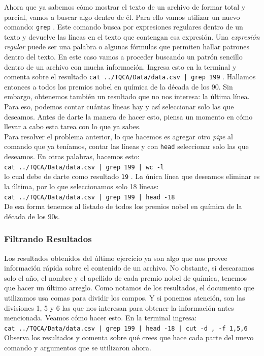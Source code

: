 \documentclass[10pt,letterpaper]{article}
\newcommand{\inlinecode}[1]{
\colorbox{light-gray}{\texttt{#1}}
}
\begin{document}
Ahora que ya sabemos c\'omo mostrar el texto de un archivo de formar total y parcial, vamos a buscar algo dentro de \'el. Para ello vamos utilizar un nuevo comando: \inlinecode{grep}. Este comando busca por expresiones regulares dentro de un texto y devuelve las l\'ineas en el texto que contengan esa expresi\'on. Una \emph{expresi\'on regular} puede ser una palabra o algunas f\'ormulas que permiten hallar patrones dentro del texto. En este caso vamos a proceder buscando un patr\'on sencillo dentro de un archivo con mucha informaci\'on. Ingresa esto en la terminal y comenta sobre el resultado \inlinecode{cat ../TQCA/Data/data.csv | grep 199}. Hallamos entonces a todos los premios nobel en qu\'imica de la d\'ecada de los 90. Sin embargo, obtenemos tambi\'en un resultado que no nos interesa: la \'ultima l\'inea. Para eso, podemos contar cu\'antas l\'ineas hay y as\'i seleccionar solo las que deseamos. Antes de darte la manera de hacer esto, piensa un momento en c\'omo llevar a cabo esta tarea con lo que ya sabes.\\

Para resolver el problema anterior, lo que hacemos es agregar otro \emph{pipe} al comando que ya ten\'iamos, contar las l\'ineas y con \inlinecode{head} seleccionar solo las que deseamos. En otras palabras, hacemos esto:\\
\inlinecode{cat ../TQCA/Data/data.csv | grep 199 | wc -l}\\
lo cual debe de darte como resultado \inlinecode{19}. La \'unica l\'inea que deseamos eliminar es la \'ultima, por lo que seleccionamos solo 18 l\'ineas:\\
\inlinecode{cat ../TQCA/Data/data.csv | grep 199 | head -18}\\
De esa forma tenemos al listado de todos los premios nobel en qu\'imica de la d\'ecada de los 90s.

\subsubsection{Filtrando Resultados}
Los resultados obtenidos del \'ultimo ejercicio ya son algo que nos provee informaci\'on r\'apida sobre el contenido de un archivo. No obstante, si desearamos solo el a\~no, el nombre y el apellido de cada premio nobel de qu\'imica, tenemos que hacer un \'ultimo arreglo. Como notamos de los resultados, el documento que utilizamos usa comas para dividir los campos. Y si ponemos atenci\'on, son las divisiones 1, 5 y 6 las que nos interesan para obtener la informaci\'on antes mencionada. Veamos c\'omo hacer esto. En la terminal ingresa:\\
\inlinecode{cat ../TQCA/Data/data.csv | grep 199 | head -18 | cut -d , -f 1,5,6}\\
Observa los resultados y comenta sobre qu\'e crees que hace cada parte del nuevo comando y argumentos que se utilizaron ahora.\\
\end{document}
